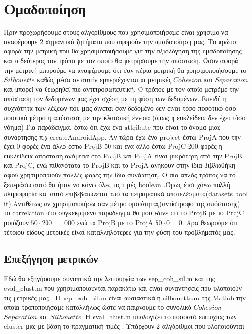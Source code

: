 \chapter{Ομαδοποίηση}
Πριν προχωρήσουμε στους αλγορίθμους που χρησιμοποιήσαμε είναι χρήσιμο να αναφέρουμε 2 σημαντικά ζητήματα που αφορούν την ομαδοποίηση μας. Το πρώτο αφορά την μετρική που θα χρησιμοποιήσουμε για την αξιολόγηση της ομαδοποίησης και ο δεύτερος τον τρόπο με τον οποίο θα μετρήσουμε την απόσταση. Όσον αφορά την μετρική μπορούμε να αναφέρουμε ότι σαν κύρια μετρική θα χρησιμοποιήσουμε το $Silhouette$ καθώς μέσα σε αυτήν εμπεριέχονται οι μετρικές $Cohesion$ και $Separation$ και μπορεί να θεωρηθεί πιο αντιπροσωπευτική.
Ο τρόπος με τον οποίο μετράμε την απόσταση τον δεδομένων μας έχει σχέση με τη φύση των δεδομένων.
Επειδή η συχνότητα των λέξεων που μας
δίνεται σαν δεδομένο δεν είναι τόσο ποσοτικό  όσο ποιοτικό μέτρο η απόσταση με την κλασσική έννοια (όπως η ευκλείδεια δεν έχει τόσο νόημα)
Για παράδειγμα, έστω ότι έχω ένα attribute που είναι το όνομα μιας συνάρτησης π.χ createAndroidApp.
Αν τώρα έχω ένα project έστω ProjA  που την έχει 0 φορές ένα άλλο έστω ProjB 50 και ένα άλλο έστω ProjC 200 φορές
η ευκλείδεια απόσταση ανάμεσα στο ProjB και ProjA είναι μικρότερη από την ProjB και ProjC, ενώ πιθανότατα το ProjB και το ProjA ανήκουν στην ίδια βιβλιοθήκη αφού χρησιμοποιούν πολλές φορές την ίδια συνάρτηση. Ο πιο απλός τρόπος να το ξεπεράσω αυτό θα ήταν να κάνω όλες τις τιμές boοlean .Όμως έτσι χάνω πολλή πληροφορία και αυτό επιβεβαιώνεται από τα πειραματικά αποτελέσματα(datasets bool it).Αντιθέτως αν χρησιμοποιήσω σαν μέτρο ομοιότητας(αντίστροφο της απόστασης) το correlation στο συγκεκριμένο παράδειγμα θα μου έδινε ότι το ProjB με το ProjC μοιάζουν $50\cdot200=1000$
ενώ το ProjB με το ProjA $50\cdot0=0$.
Άρα θεωρούμε ότι τέτοιου είδους μετρικές είναι καταλληλότερες για την φύση του προβλήματός μας.
\section{ Επεξήγηση μετρικών}
\label{metrics}
Εδώ θα εξηγήσουμε συνοπτικά την λειτουργία των sep\_coh\_sil.m και της 
eval\_clust.m που χρησιμοποιούνται παρακάτω και είναι συναντήσεις που 
υλοποιούν τις μετρικές μας . H sep\_coh\_sil.m είναι ουσιαστικά η
silhouette.m της Matlab την οποία τροποποιήσαμε καταλλήλως ώστε
να παιρνουμε το συνολικό $Cohesion$ $Separation$ και $Silhouette$.
H eval\_clust.m υπολογίζει το ποσοστό επιτυχίας των cluster μας
με βάση το πραγματική τιμές . Υπάρχουν 2 αλγόριθμοι που υλοποιούνται


